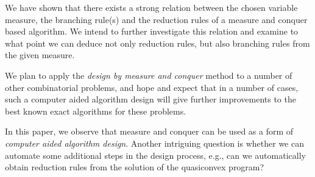 \documentclass[fleqn]{stacs_proc}
\begin{document}
We have shown that there exists a strong relation between the chosen variable measure,
the branching rule(s) and the reduction rules of a measure and conquer based algorithm.
We intend to further investigate this relation and 
examine to what point we can deduce not only reduction rules,
but also branching rules from the given measure.

We plan to apply the {\em design by measure and conquer} method to a number of other combinatorial
problems, and hope and expect that in a number of cases, such a computer aided algorithm design
will give further improvements to the best known exact algorithms for these problems.

In this paper, we observe that measure and conquer can be used as a form of
{\em computer aided algorithm design}.
Another intriguing question is whether we can automate some additional steps in the
design process, e.g., can we automatically obtain reduction rules from the 
solution of the quasiconvex program?
\end{document}
